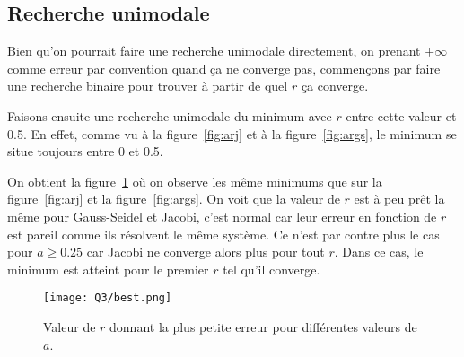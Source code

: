\subsection{Recherche unimodale}
Bien qu'on pourrait faire une recherche unimodale directement, on prenant
$+\infty$ comme erreur par convention quand ça ne converge pas,
commençons par faire une recherche binaire pour trouver à partir de quel
$r$ ça converge.

Faisons ensuite une recherche unimodale du minimum
avec $r$ entre cette valeur et 0.5.
En effet, comme vu à la figure~\ref{fig:arj} et à la figure~\ref{fig:args},
le minimum se situe toujours entre 0 et 0.5.

On obtient la figure~\ref{fig:best} où on observe les même minimums que sur la figure~\ref{fig:arj}
et la figure~\ref{fig:args}.
On voit que la valeur de $r$ est à peu prêt la même pour Gauss-Seidel et Jacobi,
c'est normal car leur erreur en fonction de $r$ est pareil comme ils résolvent le même système.
Ce n'est par contre plus le cas pour $a \geq 0.25$ car Jacobi ne converge alors plus pour tout $r$.
Dans ce cas, le minimum est atteint pour le premier $r$ tel qu'il converge.

\begin{figure}
  \centering
  \texttt{[image: Q3/best.png]}
  \caption{Valeur de $r$ donnant la plus petite erreur pour différentes valeurs de $a$.}
  \label{fig:best}
\end{figure}
